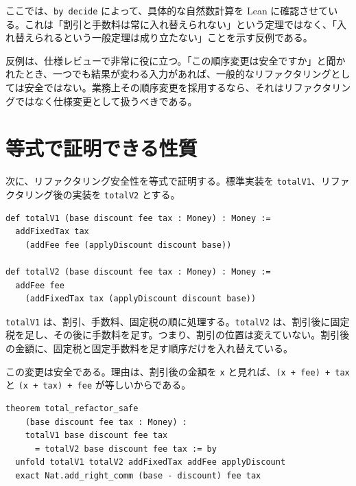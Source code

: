 ここでは、\texttt{by decide} によって、具体的な自然数計算を Lean に確認させている。これは「割引と手数料は常に入れ替えられない」という定理ではなく、「入れ替えられるという一般定理は成り立たない」ことを示す反例である。

\begin{warningbox}
反例は、仕様レビューで非常に役に立つ。「この順序変更は安全ですか」と聞かれたとき、一つでも結果が変わる入力があれば、一般的なリファクタリングとしては安全ではない。業務上その順序変更を採用するなら、それはリファクタリングではなく仕様変更として扱うべきである。
\end{warningbox}

\section{等式で証明できる性質}

次に、リファクタリング安全性を等式で証明する。標準実装を \texttt{totalV1}、リファクタリング後の実装を \texttt{totalV2} とする。

\begin{listing}[htbp]
\begin{verbatim}
def totalV1 (base discount fee tax : Money) : Money :=
  addFixedTax tax
    (addFee fee (applyDiscount discount base))

def totalV2 (base discount fee tax : Money) : Money :=
  addFee fee
    (addFixedTax tax (applyDiscount discount base))
\end{verbatim}
\caption{標準実装とリファクタリング後の実装}
\label{lst:ch20-total-v1-v2}
\end{listing}

\texttt{totalV1} は、割引、手数料、固定税の順に処理する。\texttt{totalV2} は、割引後に固定税を足し、その後に手数料を足す。つまり、割引の位置は変えていない。割引後の金額に、固定税と固定手数料を足す順序だけを入れ替えている。

この変更は安全である。理由は、割引後の金額を \texttt{x} と見れば、\texttt{(x + fee) + tax} と \texttt{(x + tax) + fee} が等しいからである。

\begin{listing}[htbp]
\begin{verbatim}
theorem total_refactor_safe
    (base discount fee tax : Money) :
    totalV1 base discount fee tax
      = totalV2 base discount fee tax := by
  unfold totalV1 totalV2 addFixedTax addFee applyDiscount
  exact Nat.add_right_comm (base - discount) fee tax
\end{verbatim}
\caption{価格計算のリファクタリング安全性}
\label{lst:ch20-total-refactor-safe}
\end{listing}

